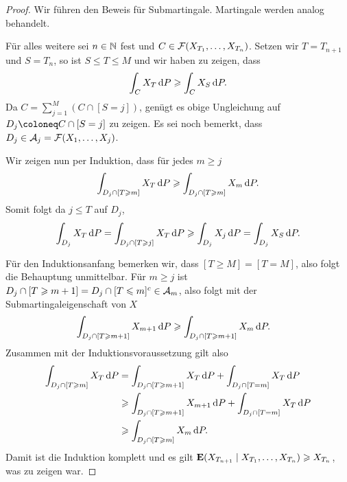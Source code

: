 \begin{proof}
Wir führen den Beweis für Submartingale. Martingale werden analog behandelt.

Für alles weitere sei $n\in\N$ fest und $C\in\FF(X_{T_1},\ldots,X_{T_n})$.
Setzen wir $T = T_{n+1}$ und $S = T_n$, so ist $S\le T \le M$ und wir haben zu
zeigen, dass
\begin{align*}
\int_C X_T \dP \ge \int_C X_S \dP. 
\end{align*}
Da $C=\sum_{j=1}^M (C\cap[S=j])$, genügt es obige Ungleichung auf $D_j \defl C
\cap [S=j]$ zu zeigen. Es sei noch bemerkt, dass $D_j\in
\AA_j = \FF(X_1,\ldots,X_j)$.

Wir zeigen nun per Induktion, dass für jedes $m \ge j$
\begin{align*}
\int_{D_j\cap [T\ge m]} X_T \dP \ge
\int_{D_j\cap [T\ge m]} X_{m} \dP.  
\end{align*}
Somit folgt da $j\le T$ auf $D_j$,
\begin{align*}
\int_{D_j} X_T \dP = \int_{D_j\cap [T\ge j]} X_T\dP
\ge \int_{D_j} X_j\dP = \int_{D_j} X_S\dP.
\end{align*}

Für den Induktionsanfang bemerken wir, dass $[T\ge M] = [T=M]$, also folgt die
Behauptung unmittelbar. Für $m\ge j$ ist 
$D_j\cap [T\ge m+1] = D_j\cap [T\le m]^c\in \AA_{m}$, also folgt mit der
Submartingaleigenschaft von $X$
\begin{align*}
\int_{D_j\cap [T\ge m+1]} X_{m+1} \dP
&\ge
\int_{D_j\cap [T\ge m+1]} X_{m} \dP.
\end{align*}
Zusammen mit der Induktionsvoraussetzung gilt also
\begin{align*}
\int_{D_j\cap [T\ge m]} X_T \dP
&=
\int_{D_j\cap [T\ge m+1]} X_T \dP
+
\int_{D_j\cap [T= m]} X_T \dP\\
&\ge 
\int_{D_j\cap [T\ge m+1]} X_{m+1} \dP
+
\int_{D_j\cap [T= m]} X_T \dP\\
&\ge
\int_{D_j\cap [T\ge m]} X_{m} \dP.
\end{align*}
Damit ist die Induktion komplett und es gilt $\E(X_{T_{n+1}}\mid
X_{T_1},\ldots,X_{T_n}) \ge X_{T_n}$, was zu zeigen war.\qedhere



\end{proof}
